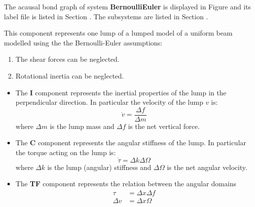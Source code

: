 

   The acausal bond graph of system \textbf{BernoulliEuler} is
   displayed in Figure  and its label
   file is listed in Section .
   The subsystems are listed in Section .

This component represents one lump of a lumped model of a uniform beam
modelled using the the Bernoulli-Euler assumptions:
\begin{enumerate}
\item The shear forces can be neglected.
\item Rotational inertia can be neglected.
\end{enumerate}

\begin{itemize}
\item The \textbf{I} component represents the inertial properties of
  the lump in the perpendicular direction. In particular the velocity
  of the lump $v$ is:
  \begin{equation}
    \dot v = \frac{\Delta f}{\Delta m}
  \end{equation}
  where $\Delta m$ is the lump mass and $\Delta f$ is the net vertical
  force.
\item The \textbf{C} component represents the angular stiffness of the
  lump. In particular the torque acting on the lump is:
  \begin{equation}
    \dot \tau =  \Delta k \Delta \Omega
  \end{equation}
  where $\Delta k$ is the lump (angular) stiffness and $\Delta \Omega$
  is the net angular velocity.
\item The \textbf{TF} component represents the relation between the
  angular domains
  \begin{equation}
    \begin{align}
      \tau &= \Delta x \Delta f \\
      \Delta v &= \Delta x \Omega 
    \end{align}
  \end{equation}
\end{itemize}
